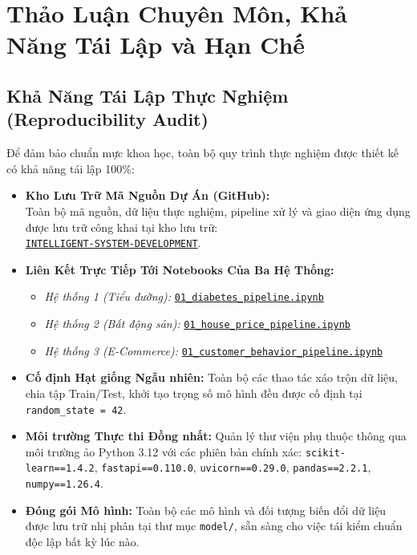 \documentclass[12pt,a4paper]{report}
\begin{document}
\chapter{Thảo Luận Chuyên Môn, Khả Năng Tái Lập và Hạn Chế}

\section{Khả Năng Tái Lập Thực Nghiệm (Reproducibility Audit)}
Để đảm bảo chuẩn mực khoa học, toàn bộ quy trình thực nghiệm được thiết kế có khả năng tái lập 100\%:
\begin{itemize}[leftmargin=2em]
    \item \textbf{Kho Lưu Trữ Mã Nguồn Dự Án (GitHub):}\\Toàn bộ mã nguồn, dữ liệu thực nghiệm, pipeline xử lý và giao diện ứng dụng được lưu trữ công khai tại kho lưu trữ:\\\href{https://github.com/phamtu2x5/INTELLIGENT-SYSTEM-DEVELOPMENT}{\texttt{INTELLIGENT-SYSTEM-DEVELOPMENT}}.
    \item \textbf{Liên Kết Trực Tiếp Tới Notebooks Của Ba Hệ Thống:}
    \begin{itemize}
        \item \textit{Hệ thống 1 (Tiểu đường):} \href{https://github.com/phamtu2x5/INTELLIGENT-SYSTEM-DEVELOPMENT/blob/main/src/Assigment%2002/diabetes/notebook/01_diabetes_pipeline.ipynb}{\texttt{01\_diabetes\_pipeline.ipynb}}
        \item \textit{Hệ thống 2 (Bất động sản):} \href{https://github.com/phamtu2x5/INTELLIGENT-SYSTEM-DEVELOPMENT/blob/main/src/Assigment%2002/house_price/notebook/01_house_price_pipeline.ipynb}{\texttt{01\_house\_price\_pipeline.ipynb}}
        \item \textit{Hệ thống 3 (E-Commerce):} \href{https://github.com/phamtu2x5/INTELLIGENT-SYSTEM-DEVELOPMENT/blob/main/src/Assigment%2002/customer_behavior/notebook/01_customer_behavior_pipeline.ipynb}{\texttt{01\_customer\_behavior\_pipeline.ipynb}}
    \end{itemize}
    \item \textbf{Cố định Hạt giống Ngẫu nhiên:} Toàn bộ các thao tác xáo trộn dữ liệu, chia tập Train/Test, khởi tạo trọng số mô hình đều được cố định tại \texttt{random\_state = 42}.
    \item \textbf{Môi trường Thực thi Đồng nhất:} Quản lý thư viện phụ thuộc thông qua môi trường ảo Python 3.12 với các phiên bản chính xác: \texttt{scikit-learn==1.4.2}, \texttt{fastapi==0.110.0}, \texttt{uvicorn==0.29.0}, \texttt{pandas==2.2.1}, \texttt{numpy==1.26.4}.
    \item \textbf{Đóng gói Mô hình:} Toàn bộ các mô hình và đối tượng biến đổi dữ liệu được lưu trữ nhị phân tại thư mục \texttt{model/}, sẵn sàng cho việc tái kiểm chuẩn độc lập bất kỳ lúc nào.
\end{itemize}
\end{document}
